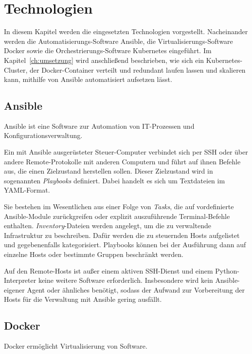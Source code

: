 \chapter{Technologien}\label{ch:technologien}

In diesem Kapitel werden die eingesetzten Technologien vorgestellt.
Nacheinander werden die Automatisierungs-Software Ansible, die Virtualisierungs-Software Docker sowie die Orchestrierungs-Software Kubernetes eingeführt.
Im Kapitel~\ref{ch:umsetzung} wird anschließend beschrieben, wie sich ein Kubernetes-Cluster, der Docker-Container verteilt und redundant laufen lassen und skalieren kann, mithilfe von Ansible automatisiert aufsetzen lässt.

\section{Ansible}\label{sec:ansible}

Ansible ist eine Software zur Automation von IT-Prozessen und Konfigurationsverwaltung.

Ein mit Ansible ausgerüsteter Steuer-Computer verbindet sich per SSH oder über andere Remote-Protokolle mit anderen Computern und führt auf ihnen Befehle aus, die einen Zielzustand herstellen sollen.
Dieser Zielzustand wird in sogenannten \emph{Playbooks} definiert.
Dabei handelt es sich um Textdateien im YAML-Format.

Sie bestehen im Wesentlichen aus einer Folge von \emph{Tasks}, die auf vordefinierte Ansible-Module zurückgreifen oder explizit auszuführende Terminal-Befehle enthalten.
\emph{Inventory}-Dateien werden angelegt, um die zu verwaltende Infrastruktur zu beschreiben.
Dafür werden die zu steuernden Hosts aufgelistet und gegebenenfalls kategorisiert.
Playbooks können bei der Ausführung dann auf einzelne Hosts oder bestimmte Gruppen beschränkt werden.

Auf den Remote-Hosts ist außer einem aktiven SSH-Dienst und einem Python-Interpreter keine weitere Software erforderlich.
Insbesondere wird kein Ansible-eigener Agent oder ähnliches benötigt, sodass der Aufwand zur Vorbereitung der Hosts für die Verwaltung mit Ansible gering ausfällt.

\section{Docker}\label{sec:docker}

Docker ermöglicht Virtualisierung von Software.

